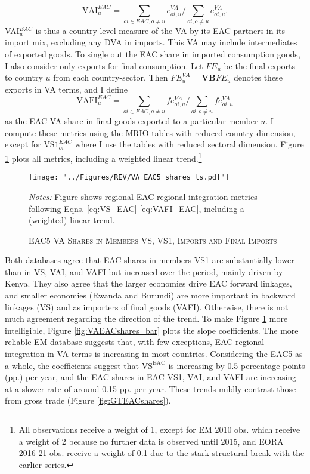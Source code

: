 \documentclass[a4paper]{article}
\begin{document}
%
\begin{equation}
\text{VAI}_u^{EAC} = \sum_{oi \in EAC, o \neq u}  e_{oi, u}^{VA}  \bigg/ \sum_{oi, o \neq u}  e_{oi, u}^{VA}.  
\end{equation}
%
VAI$_u^{EAC}$ is thus a country-level measure of the VA by its EAC partners in its import mix, excluding any DVA in imports. This VA may include intermediates of exported goods. To single out the EAC share in imported consumption goods, I also consider only exports for final consumption. Let $FE_u$ be the final exports to country $u$ from each country-sector. Then $FE_u^{VA} = \textbf{VB}FE_u$ denotes these exports in VA terms, and I define
%
\begin{equation} \label{eq:VAFI_EAC}
\text{VAFI}_{u}^{EAC} = \sum_{oi \in EAC, o \neq u}  fe_{oi, u}^{VA}  \bigg/ \sum_{oi, o \neq u}  fe_{oi, u}^{VA}
\end{equation}
%
\noindent as the EAC VA share in final goods exported to a particular member $u$. I compute these metrics using the MRIO tables with reduced country dimension, except for $\text{VS1}_{oi}^{EAC}$ where I use the tables with reduced sectoral dimension. Figure \ref{fig:VAEACshares} plots all metrics, including a weighted linear trend.\footnote{All observations receive a weight of 1, except for EM 2010 obs. which receive a weight of 2 because no further data is observed until 2015, and EORA 2016-21 obs. receive a weight of 0.1 due to the stark structural break with the earlier series. \vspace{-8mm}}

\begin{figure}[h!] %
\centering
\caption{\label{fig:VAEACshares}\textsc{EAC5 VA Shares in Members VS, VS1, Imports and Final Imports}}
\texttt{[image: "../Figures/REV/VA\_EAC5\_shares\_ts.pdf"]} \\ 
\raggedright
\scriptsize
\emph{Notes:} Figure shows regional EAC regional integration metrics following Eqns. \ref{eq:VS_EAC}-\ref{eq:VAFI_EAC}, including a (weighted) linear trend. 
\end{figure}
\FloatBarrier

Both databases agree that EAC shares in members VS1 are substantially lower than in VS, VAI, and VAFI but increased over the period, mainly driven by Kenya. They also agree that the larger economies drive EAC forward linkages, and smaller economies (Rwanda and Burundi) are more important in backward linkages (VS) and as importers of final goods (VAFI). Otherwise, there is not much agreement regarding the direction of the trend. To make Figure \ref{fig:VAEACshares} more intelligible, Figure \ref{fig:VAEACshares_bar} plots the slope coefficients. The more reliable EM database suggests that, with few exceptions, EAC regional integration in VA terms is increasing in most countries. Considering the EAC5 as a whole, the coefficients suggest that $\text{VS}^\text{EAC}$ is increasing by 0.5 percentage points (pp.) per year, and the EAC shares in EAC VS1, VAI, and VAFI are increasing at a slower rate of around 0.15 pp. per year. These trends mildly contrast those from gross trade (Figure \ref{fig:GTEACshares}).
\end{document}
